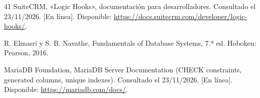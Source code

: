 \begin{thebibliography}{41}
 SuiteCRM, «Logic Hooks», documentación para desarrolladores. Consultado el 23/11/2026. [En línea]. Disponible: \url{https://docs.suitecrm.com/developer/logic-hooks/}.

 R. Elmasri y S. B. Navathe, Fundamentals of Database Systems, 7.ª ed. Hoboken: Pearson, 2016.

 MariaDB Foundation, MariaDB Server Documentation (CHECK constraints, generated columns, unique indexes). Consultado el 23/11/2026. [En línea]. Disponible: \url{https://mariadb.com/docs/}.

\end{thebibliography}
